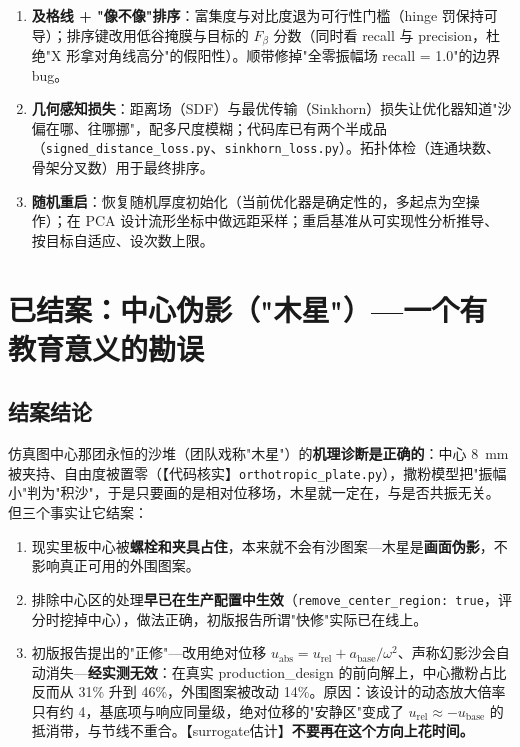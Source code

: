 \documentclass[11pt,a4paper]{article}
\newcommand{\code}[1]{\texttt{#1}}
\begin{document}
\begin{enumerate}[leftmargin=2em]
\item \textbf{及格线 + "像不像"排序}：富集度与对比度退为可行性门槛（hinge 罚保持可导）；排序键改用低谷掩膜与目标的 $F_\beta$ 分数（同时看 recall 与 precision，杜绝"X 形拿对角线高分"的假阳性）。顺带修掉"全零振幅场 recall = 1.0"的边界 bug。
\item \textbf{几何感知损失}：距离场（SDF）与最优传输（Sinkhorn）损失让优化器知道"沙偏在哪、往哪挪"，配多尺度模糊；代码库已有两个半成品（\code{signed\_distance\_loss.py}、\code{sinkhorn\_loss.py}）。拓扑体检（连通块数、骨架分叉数）用于最终排序。
\item \textbf{随机重启}：恢复随机厚度初始化（当前优化器是确定性的，多起点为空操作）；在 PCA 设计流形坐标中做远距采样；重启基准从可实现性分析推导、按目标自适应、设次数上限。
\end{enumerate}

\section{已结案：中心伪影（"木星"）---一个有教育意义的勘误}

\subsection{结案结论}

仿真图中心那团永恒的沙堆（团队戏称"木星"）的\textbf{机理诊断是正确的}：中心 8~mm 被夹持、自由度被置零（【代码核实】\code{orthotropic\_plate.py}），撒粉模型把"振幅小"判为"积沙"，于是只要画的是相对位移场，木星就一定在，与是否共振无关。但三个事实让它结案：

\begin{enumerate}[leftmargin=2em]
\item 现实里板中心被\textbf{螺栓和夹具占住}，本来就不会有沙图案---木星是\textbf{画面伪影}，不影响真正可用的外围图案。
\item 排除中心区的处理\textbf{早已在生产配置中生效}（\code{remove\_center\_region: true}，评分时挖掉中心），做法正确，初版报告所谓"快修"实际已在线上。
\item 初版报告提出的"正修"---改用绝对位移 $u_{\mathrm{abs}} = u_{\mathrm{rel}} + a_{\mathrm{base}}/\omega^2$、声称幻影沙会自动消失---\textbf{经实测无效}：在真实 production\_design 的前向解上，中心撒粉占比反而从 31\% 升到 46\%，外围图案被改动 14\%。原因：该设计的动态放大倍率只有约 4，基底项与响应同量级，绝对位移的"安静区"变成了 $u_{\mathrm{rel}}\approx -u_{\mathrm{base}}$ 的抵消带，与节线不重合。【surrogate估计】\textbf{不要再在这个方向上花时间。}
\end{enumerate}
\end{document}
